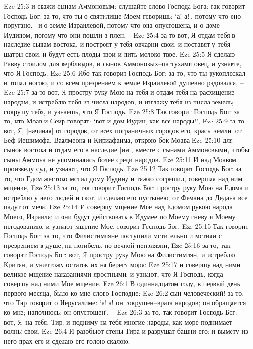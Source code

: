 Eze 25:3  и скажи сынам Аммоновым: слушайте слово Господа Бога: так говорит Господь Бог: за то, что ты о святилище Моем говоришь: `а! а!', потому что оно поругано, --и о земле Израилевой, потому что она опустошена, и о доме Иудином, потому что они пошли в плен, --
Eze 25:4  за то вот, Я отдам тебя в наследие сынам востока, и построят у тебя овчарни свои, и поставят у тебя шатры свои, и будут есть плоды твои и пить молоко твое.
Eze 25:5  Я сделаю Равву стойлом для верблюдов, и сынов Аммоновых--пастухами овец, и узнаете, что Я Господь.
Eze 25:6  Ибо так говорит Господь Бог: за то, что ты рукоплескал и топал ногою, и со всем презрением к земле Израилевой душевно радовался, --
Eze 25:7  за то вот, Я простру руку Мою на тебя и отдам тебя на расхищение народам, и истреблю тебя из числа народов, и изглажу тебя из числа земель; сокрушу тебя, и узнаешь, что Я Господь.
Eze 25:8  Так говорит Господь Бог: за то, что Моав и Сеир говорят: `вот и дом Иудин, как все народы!',
Eze 25:9  за то вот, Я, [начиная] от городов, от всех пограничных городов его, красы земли, от Беф-Иешимофа, Ваалмеона и Кириафаима, открою бок Моава
Eze 25:10  для сынов востока и отдам его в наследие [им], вместе с сынами Аммоновыми, чтобы сыны Аммона не упоминались более среди народов.
Eze 25:11  И над Моавом произведу суд, и узнают, что Я Господь.
Eze 25:12  Так говорит Господь Бог: за то, что Едом жестоко мстил дому Иудину и тяжко согрешил, совершая над ним мщение,
Eze 25:13  за то, так говорит Господь Бог: простру руку Мою на Едома и истреблю у него людей и скот, и сделаю его пустынею; от Фемана до Дедана все падут от меча.
Eze 25:14  И совершу мщение Мое над Едомом рукою народа Моего, Израиля; и они будут действовать в Идумее по Моему гневу и Моему негодованию, и узнают мщение Мое, говорит Господь Бог.
Eze 25:15  Так говорит Господь Бог: за то, что Филистимляне поступили мстительно и мстили с презрением в душе, на погибель, по вечной неприязни,
Eze 25:16  за то, так говорит Господь Бог: вот, Я простру руку Мою на Филистимлян, и истреблю Критян, и уничтожу остаток их на берегу моря;
Eze 25:17  и совершу над ними великое мщение наказаниями яростными; и узнают, что Я Господь, когда совершу над ними Мое мщение.
Eze 26:1  В одиннадцатом году, в первый день первого месяца, было ко мне слово Господне:
Eze 26:2  сын человеческий! за то, что Тир говорит о Иерусалиме: `а! а! он сокрушен--врата народов; он обращается ко мне; наполнюсь; он опустошен', --
Eze 26:3  за то, так говорит Господь Бог: вот, Я--на тебя, Тир, и подниму на тебя многие народы, как море поднимает волны свои.
Eze 26:4  И разобьют стены Тира и разрушат башни его; и вымету из него прах его и сделаю его голою скалою.
